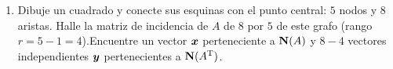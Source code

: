 \documentclass[12pt,a4paper]{article}
\newcommand{\bi}[1]{\hbox{\boldmath$#1$}}
\newcommand\1{\mbox{\,\vrule height-0.8pt depth1.0pt width2pc\,}}
\newcommand\2{\mbox{\,\vrule height-0.8pt depth1.0pt width1pc\,}}
\DeclareRobustCommand\transp{^{\mathrm{T}}}
\newcommand\bfcdot{\boldsymbol{\cdot}}
\begin{document}
\begin{enumerate}


\item Dibuje un cuadrado y conecte sus esquinas con el punto central: $5$ nodos y $8$ aristas.
Halle la matriz de incidencia de $A$ de $8$ por $5$ de este grafo (rango $r=5-1=4$).\linebreak Encuentre un vector $\bi{x}$ perteneciente a $\hbox{\textbf{N}}(A)$ y $8-4$ vectores independientes $\bi{y}$ pertenecientes a $\hbox{\textbf{N}}(A\transp)$.



\end{enumerate}
\end{document}
